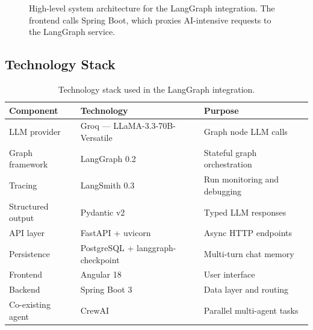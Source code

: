\documentclass[11pt,a4paper]{article}
\begin{document}
\begin{figure}[H]
\centering
{}
    \caption{High-level system architecture for the LangGraph integration. The frontend calls Spring Boot, which proxies AI-intensive requests to the LangGraph service.}
    \label{fig:architecture}
\end{figure}

\subsection{Technology Stack}

\begin{table}[H]
\centering
\begin{tabular}{@{}lll@{}}
\toprule
\textbf{Component} & \textbf{Technology} & \textbf{Purpose} \\
\midrule
LLM provider       & Groq --- LLaMA-3.3-70B-Versatile & Graph node LLM calls \\
Graph framework    & LangGraph 0.2                    & Stateful graph orchestration \\
Tracing            & LangSmith 0.3                    & Run monitoring and debugging \\
Structured output  & Pydantic v2                      & Typed LLM responses \\
API layer          & FastAPI + uvicorn                & Async HTTP endpoints \\
Persistence        & PostgreSQL + langgraph-checkpoint & Multi-turn chat memory \\
Frontend           & Angular 18                       & User interface \\
Backend            & Spring Boot 3                    & Data layer and routing \\
Co-existing agent  & CrewAI                           & Parallel multi-agent tasks \\
\bottomrule
\end{tabular}
\caption{Technology stack used in the LangGraph integration.}
\end{table}
\end{document}
